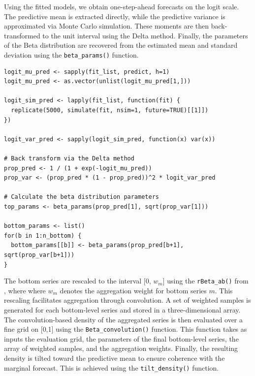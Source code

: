Using the fitted models, we obtain one-step-ahead forecasts on the logit scale. The predictive mean is extracted directly, while the predictive variance is approximated via Monte Carlo simulation. These moments are then back-transformed to the unit interval using the Delta method. Finally, the parameters of the Beta distribution are recovered from the estimated mean and standard deviation using the \texttt{beta\_params()} function.

\begin{verbatim}
logit_mu_pred <- sapply(fit_list, predict, h=1)
logit_mu_pred <- as.vector(unlist(logit_mu_pred[1,]))

logit_sim_pred <- lapply(fit_list, function(fit) {
  replicate(5000, simulate(fit, nsim=1, future=TRUE)[[1]])
})

logit_var_pred <- sapply(logit_sim_pred, function(x) var(x))

# Back transform via the Delta method
prop_pred <- 1 / (1 + exp(-logit_mu_pred))
prop_var <- (prop_pred * (1 - prop_pred))^2 * logit_var_pred

# Calculate the beta distribution parameters
top_params <- beta_params(prop_pred[1], sqrt(prop_var[1]))

bottom_params <- list()
for(b in 1:n_bottom) {
  bottom_params[[b]] <- beta_params(prop_pred[b+1], sqrt(prop_var[b+1]))
}
\end{verbatim}

The bottom series are rescaled to the interval {[}0, \(w_{m}\){]} using the \texttt{rBeta\_ab()} from , where where \(w_{m}\) denotes the aggregation weight for bottom series \(m\). This rescaling facilitates aggregation through convolution. A set of weighted samples is generated for each bottom-level series and stored in a three-dimensional array. The convolution-based density of the aggregated series is then evaluated over a fine grid on {[}0,1{]} using the \texttt{Beta\_convolution()} function. This function takes as inputs the evaluation grid, the parameters of the final bottom-level series, the array of weighted samples, and the aggregation weights. Finally, the resulting density is tilted toward the predictive mean to ensure coherence with the marginal forecast. This is achieved using the \texttt{tilt\_density()} function.

